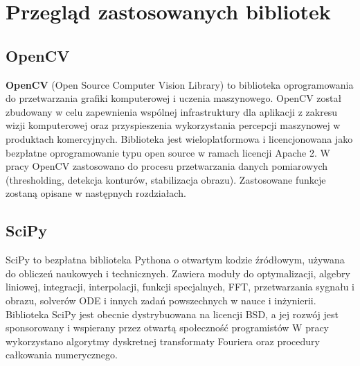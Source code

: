 \documentclass[a4paper,11pt,twoside,openright]{article} %
\title{}
\author{}
\date{}
\begin{document}
\renewcommand{\figurename}{Rys.} %
\renewcommand{\tablename}{Tab.}

\section{Przegląd zastosowanych bibliotek}
\subsection{OpenCV}
\noindent \textbf{OpenCV} (Open Source Computer Vision Library) to biblioteka oprogramowania do przetwarzania grafiki komputerowej i uczenia maszynowego. OpenCV został zbudowany w celu zapewnienia wspólnej infrastruktury dla aplikacji z zakresu wizji komputerowej oraz przyspieszenia wykorzystania percepcji maszynowej w produktach komercyjnych. Biblioteka jest wieloplatformowa i licencjonowana jako bezpłatne oprogramowanie typu open source w ramach licencji Apache 2. W pracy OpenCV zastosowano do procesu przetwarzania danych pomiarowych (thresholding, detekcja konturów, stabilizacja obrazu). Zastosowane funkcje zostaną opisane w następnych rozdziałach.

\subsection{SciPy}
\noindent SciPy to bezpłatna biblioteka Pythona o otwartym kodzie źródłowym, używana do obliczeń naukowych i technicznych. Zawiera moduły do optymalizacji, algebry liniowej, integracji, interpolacji, funkcji specjalnych, FFT, przetwarzania sygnału i obrazu, solverów ODE i innych zadań powszechnych w nauce i inżynierii. Biblioteka SciPy jest obecnie dystrybuowana na licencji BSD, a jej rozwój jest sponsorowany i wspierany przez otwartą społeczność programistów
W pracy wykorzystano algorytmy dyskretnej transformaty Fouriera oraz procedury całkowania numerycznego. 
\end{document}

